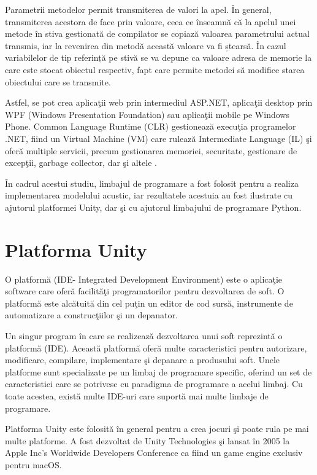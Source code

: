 	Parametrii metodelor permit transmiterea de valori la apel. În general, transmiterea acestora de face prin valoare, ceea ce înseamnă că la apelul unei metode în stiva gestionată de compilator se copiază valoarea parametrului actual transmis, iar la revenirea din metodă această valoare va fi ștearsă. În cazul variabilelor de tip referință pe stivă se va depune ca valoare adresa de memorie la care este stocat obiectul respectiv, fapt care permite metodei să modifice starea obiectului care se transmite.
	 	
	Astfel, se pot crea aplica\c{t}ii web prin intermediul ASP.NET, aplica\c{t}ii desktop prin WPF (Windows Presentation Foundation) sau aplica\c{t}ii mobile pe Windows Phone. Common Language Runtime (CLR) gestioneaz\u{a} execu\c{t}ia programelor .NET, fiind un Virtual Machine (VM) care ruleaz\u{a} Intermediate Language (IL) \c{s}i ofer\u{a} multiple servicii, precum gestionarea memoriei, securitate, gestionare de excep\c{t}ii, garbage collector, dar \c{s}i altele  \cite{limbaj}. 	 
	
	\^{I}n cadrul acestui studiu, limbajul de programare a fost folosit pentru a realiza implementarea modelului acustic, iar rezultatele acestuia au fost ilustrate cu ajutorul platformei Unity, dar \c{s}i cu ajutorul limbajului de programare Python.
		
\section{Platforma Unity}

	O platform\u{a} (IDE- Integrated Development Environment) este o aplica\c{t}ie software care ofer\u{a} facilit\u{a}\c{t}i programatorilor pentru dezvoltarea de soft. O platform\u{a} este alc\u{a}tuit\u{a} din cel pu\c{t}in un editor de cod surs\u{a}, instrumente de automatizare a construc\c{t}iilor \c{s}i un depanator.
	 	
	Un singur program \^{i}n care se realizeaz\u{a} dezvoltarea unui soft reprezint\u{a} o platform\u{a} (IDE). Aceast\u{a} platform\u{a} ofer\u{a} multe caracteristici pentru autorizare, modificare, compilare, implementare \c{s}i depanare a produsului soft. Unele platforme sunt specializate pe un limbaj de programare specific, oferind un set de caracteristici care se potrivesc cu paradigma de programare a acelui limbaj. Cu toate acestea, exist\u{a} multe IDE-uri  care suport\u{a} mai multe limbaje de programare.	 
	
	Platforma Unity este folosit\u{a} \^{i}n general pentru a crea jocuri \c{s}i poate rula pe mai multe platforme. A fost dezvoltat de Unity Technologies \c{s}i lansat \^{i}n 2005 la Apple Inc's Worldwide Developers Conference ca fiind un game engine exclusiv pentru macOS. 
	 	
